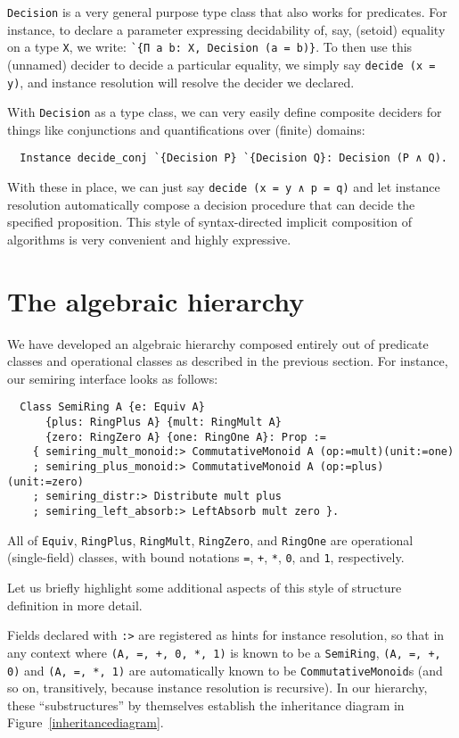 \documentclass[a4paper,10pt,runningheads]{llncs}
\begin{document}
\lstinline|Decision| is a very general purpose type class that also works for predicates. For instance, to declare a parameter expressing decidability of, say, (setoid) equality on a type \lstinline|X|, we write: \lstinline|`{Π a b: X, Decision (a = b)}|. To then use this (unnamed) decider to decide a particular equality, we simply say \lstinline|decide (x = y)|, and instance resolution will resolve the decider we declared.

With \lstinline|Decision| as a type class, we can very easily define composite deciders for things like conjunctions and quantifications over (finite) domains:
\begin{lstlisting}
  Instance decide_conj `{Decision P} `{Decision Q}: Decision (P ∧ Q).
\end{lstlisting}
With these in place, we can just say \lstinline|decide (x = y ∧ p = q)| and let instance resolution automatically compose a decision procedure that can decide the specified proposition. This style of syntax-directed implicit composition of algorithms is very convenient and highly expressive.

\section{The algebraic hierarchy}\label{classes}

We have developed an algebraic hierarchy composed entirely out of predicate classes and operational classes as described in the previous section. For instance, our semiring interface looks as follows:
\begin{lstlisting}
  Class SemiRing A {e: Equiv A}
      {plus: RingPlus A} {mult: RingMult A}
      {zero: RingZero A} {one: RingOne A}: Prop :=
    { semiring_mult_monoid:> CommutativeMonoid A (op:=mult)(unit:=one)
    ; semiring_plus_monoid:> CommutativeMonoid A (op:=plus)(unit:=zero)
    ; semiring_distr:> Distribute mult plus
    ; semiring_left_absorb:> LeftAbsorb mult zero }.
\end{lstlisting}
All of \lstinline|Equiv|, \lstinline|RingPlus|, \lstinline|RingMult|, \lstinline|RingZero|, and \lstinline|RingOne| are operational (single-field) classes, with bound notations \lstinline|=|, \lstinline|+|, \lstinline|*|, \lstinline|0|, and \lstinline|1|, respectively.

Let us briefly highlight some additional aspects of this style of structure definition in more detail.

Fields declared with \lstinline|:>| are registered as hints for instance resolution, so that in any context where \lstinline|(A, =, +, 0, *, 1)| is known to be a \lstinline|SemiRing|, \lstinline|(A, =, +, 0)| and \lstinline|(A, =, *, 1)| are automatically known to be \lstinline|CommutativeMonoid|s (and so on, transitively, because instance resolution is recursive). In our hierarchy, these ``substructures'' by themselves establish the inheritance diagram in Figure~\ref{inheritancediagram}. %
\end{document}
